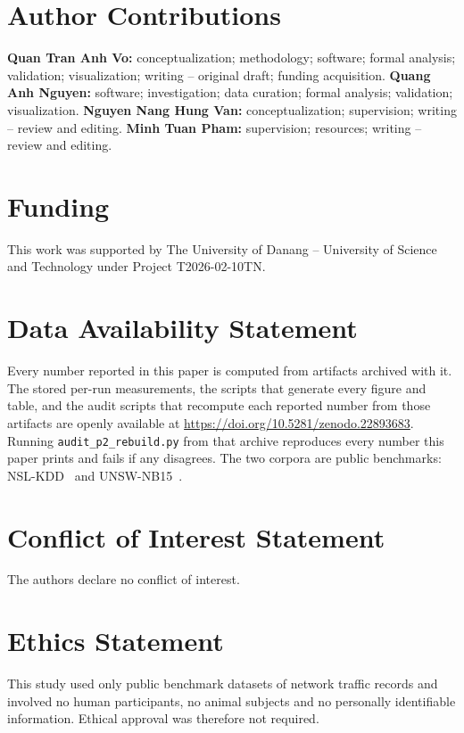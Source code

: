 \documentclass[journal]{IEEEtran}
\begin{document}
\section*{Author Contributions}
\textbf{Quan Tran Anh Vo:} conceptualization; methodology; software; formal
analysis; validation; visualization; writing -- original draft; funding
acquisition. \textbf{Quang Anh Nguyen:} software; investigation; data
curation; formal analysis; validation; visualization. \textbf{Nguyen Nang
Hung Van:} conceptualization; supervision; writing -- review and editing.
\textbf{Minh Tuan Pham:} supervision; resources; writing -- review and
editing.

\section*{Funding}
This work was supported by The University of Danang -- University of Science
and Technology under Project T2026-02-10TN.

\section*{Data Availability Statement}
Every number reported in this paper is computed from artifacts archived with
it. The stored per-run measurements, the scripts that generate every figure
and table, and the audit scripts that recompute each reported number from
those artifacts are openly available at
\url{https://doi.org/10.5281/zenodo.22893683}. Running
\texttt{audit\_p2\_rebuild.py} from that archive reproduces every number
this paper prints and fails if any disagrees. The two corpora are public
benchmarks: NSL-KDD~\cite{tavallaee2009nslkdd} and
UNSW-NB15~\cite{moustafa2015unsw}.

\section*{Conflict of Interest Statement}
The authors declare no conflict of interest.

\section*{Ethics Statement}
This study used only public benchmark datasets of network traffic records and
involved no human participants, no animal subjects and no personally
identifiable information. Ethical approval was therefore not required.

%
\end{document}
